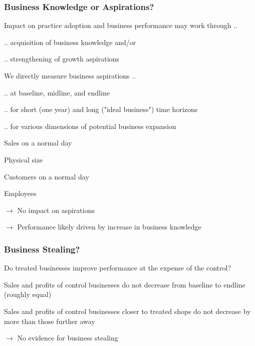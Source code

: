 \documentclass[hideothersubsections, usenames,dvipsnames,11pt]{beamer}
\newenvironment{itemize_2pt}{\itemize\addtolength{\itemsep}{2pt}}{\enditemize}
\begin{document}
\begin{frame}
\frametitle{Business Knowledge or Aspirations?}
Impact on practice adoption and business performance may work through ..
\begin{itemize_2pt}
	\item .. acquisition of \textcolor{bdf}{business knowledge} and/or
	\item .. strengthening of \textcolor{bdf}{growth aspirations}
\end{itemize_2pt}

\pause
\vspace{1.0em}

We directly measure \textcolor{bdf}{business aspirations} .. 
\begin{itemize_2pt}
	\item .. at baseline, midline, and endline
	\item .. for short (one year) and long ("ideal business") time horizons
	\item .. for various dimensions of potential business expansion
    \begin{itemize_2pt}
   		\item Sales on a normal day
    	\item Physical size
   		\item Customers on a normal day
    	\item Employees
    \end{itemize_2pt}
\item[] $\rightarrow$ \textcolor{bdf}{No impact on aspirations}
\item[] $\rightarrow$ Performance likely driven by increase in \textcolor{bdf}{business knowledge}
\end{itemize_2pt}

\end{frame}

\begin{frame}
\frametitle{Business Stealing?}
Do treated businesses improve performance at the expense of the control?
\vspace{0.1in}
\begin{itemize_2pt}
\item Sales and profits of \textcolor{bdf}{control businesses do not decrease} from baseline to endline (roughly equal)
\item Sales and profits of control businesses \textcolor{bdf}{closer to treated shops do not decrease by more} than those further away
\item[] $\rightarrow$ \textcolor{bdf}{No evidence for business stealing}
\end{itemize_2pt}
\end{frame}
\end{document}
